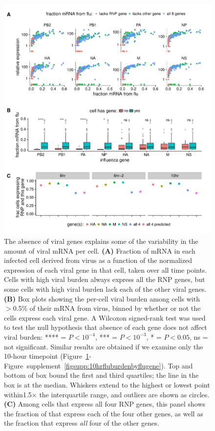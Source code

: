 \documentclass[9pt,lineno]{elife}
\begin{document}
\begin{figure}[t!]
\centerline{\includegraphics[width=0.9\linewidth]{figures/p_flu_burden_flu_gene_merge.pdf}}
\caption{\label{fig:fluburdenbyflugene}
The absence of viral genes explains some of the variability in the amount of viral mRNA per cell.
{\bf (A)} 
Fraction of mRNA in each infected cell derived from virus as a function of the normalized expression of each viral gene in that cell, taken over all time points.
Cells with high viral burden always express all the RNP genes, but some cells with high viral burden lack each of the other viral genes.
{\bf (B)}
Box plots showing the per-cell viral burden among cells with $>$0.5\% of their mRNA from virus, binned by whether or not the cells express each viral gene.
A Wilcoxon signed-rank test was used to test the null hypothesis that absence of each gene does not affect viral burden: **** = $P < 10^{-4}$, *** = $P < 10^{-3}$,  * = $P < 0.05$, ns = not significant.
Similar results are obtained if we examine only the 10-hour timepoint (Figure~\ref{fig:fluburdenbyflugene}-Figure~supplement~\ref{figsupp:10hrfluburdenbyflugene}).
Top and bottom of box bound the first and third quartiles; the line in the box is at the median.
Whiskers extend to the highest or lowest point within1.5$\times$ the interquartile range, and outliers are shown as circles.
{\bf (C)}
Among cells that express all four RNP genes, this panel shows the fraction of that express each of the four other genes, as well as the fraction that express \emph{all} four of the other genes.
}
\end{figure}
\end{document}
